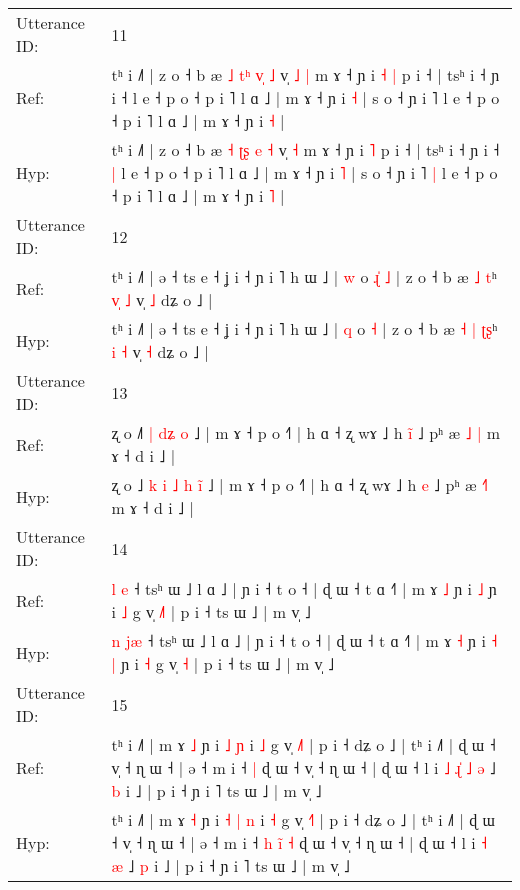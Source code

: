 \documentclass[10pt]{article}
\DeclareRobustCommand{\hl}[1]{{\textcolor{red}{#1}}}
\begin{document}
\begin{longtable}{ll}
 \\
\midrule
Utterance ID: & 11 \\
Ref: & tʰ i ˩˥ | z o ˧ b æ \hl{˩} \hl{t}\hl{ʰ} \hl{v}\hl{̩} \hl{˩} v̩\hl{ }\hl{˩} \hl{|} m ɤ ˧ ɲ i\hl{ }\hl{˧} \hl{|} p i ˧ | tsʰ i ˧ ɲ i ˧\hl{}\hl{} l e ˧ p o ˧ p i ˥ l ɑ ˩ | m ɤ ˧ ɲ i \hl{˧} | s o ˧ ɲ i ˥\hl{}\hl{} l e ˧ p o ˧ p i ˥ l ɑ ˩ | m ɤ ˧ ɲ i \hl{˧} |
 \\
Hyp: & tʰ i ˩˥ | z o ˧ b æ \hl{˧} \hl{ʈ}\hl{ʂ} \hl{}\hl{e} \hl{˧} v̩\hl{}\hl{} \hl{˧} m ɤ ˧ ɲ i\hl{}\hl{} \hl{˥} p i ˧ | tsʰ i ˧ ɲ i ˧\hl{ }\hl{|} l e ˧ p o ˧ p i ˥ l ɑ ˩ | m ɤ ˧ ɲ i \hl{˥} | s o ˧ ɲ i ˥\hl{ }\hl{|} l e ˧ p o ˧ p i ˥ l ɑ ˩ | m ɤ ˧ ɲ i \hl{˥} |
 \\
\midrule
Utterance ID: & 12 \\
Ref: & tʰ i ˩˥ | ə ˧ ts e ˧ ʝ i ˧ ɲ i ˥ h ɯ ˩ | \hl{w} o\hl{ }\hl{ɻ}\hl{̍} \hl{˩} | z o ˧ b æ\hl{}\hl{} \hl{˩} \hl{}\hl{t}ʰ \hl{v}\hl{̩} \hl{˩} v̩ \hl{˩} dʑ o ˩ |
 \\
Hyp: & tʰ i ˩˥ | ə ˧ ts e ˧ ʝ i ˧ ɲ i ˥ h ɯ ˩ | \hl{q} o\hl{}\hl{}\hl{} \hl{˧} | z o ˧ b æ\hl{ }\hl{˧} \hl{|} \hl{ʈ}\hl{ʂ}ʰ \hl{}\hl{i} \hl{˧} v̩ \hl{˧} dʑ o ˩ |
 \\
\midrule
Utterance ID: & 13 \\
Ref: & ʐ o ˩\hl{}\hl{˥} \hl{|} \hl{}\hl{d}\hl{ʑ} \hl{}\hl{o} ˩ | m ɤ ˧ p o ˧˥ | h ɑ ˧ ʐ wɤ ˩ h \hl{i}\hl{̃} ˩ pʰ æ \hl{˩}\hl{ }\hl{|} m ɤ ˧ d i ˩ |
 \\
Hyp: & ʐ o ˩\hl{ }\hl{k} \hl{i} \hl{˩}\hl{ }\hl{h} \hl{i}\hl{̃} ˩ | m ɤ ˧ p o ˧˥ | h ɑ ˧ ʐ wɤ ˩ h \hl{}\hl{e} ˩ pʰ æ \hl{}\hl{˧}\hl{˥} m ɤ ˧ d i ˩ |
 \\
\midrule
Utterance ID: & 14 \\
Ref: & \hl{l} \hl{}\hl{e} ˧ tsʰ ɯ ˩ l ɑ ˩ | ɲ i ˧ t o ˧ | ɖ ɯ ˧ t ɑ ˧˥ | m ɤ \hl{˩} ɲ i\hl{}\hl{} \hl{˩} ɲ i \hl{˩} g v̩ \hl{˩}\hl{˥} | p i ˧ ts ɯ ˩ | m v̩ ˩
 \\
Hyp: & \hl{n} \hl{j}\hl{æ} ˧ tsʰ ɯ ˩ l ɑ ˩ | ɲ i ˧ t o ˧ | ɖ ɯ ˧ t ɑ ˧˥ | m ɤ \hl{˧} ɲ i\hl{ }\hl{˧} \hl{|} ɲ i \hl{˧} g v̩ \hl{}\hl{˧} | p i ˧ ts ɯ ˩ | m v̩ ˩
 \\
\midrule
Utterance ID: & 15 \\
Ref: & tʰ i ˩˥ | m ɤ \hl{˩} ɲ i\hl{}\hl{} \hl{˩} \hl{ɲ} i \hl{˩} g v̩ \hl{˩}˥ | p i ˧ dʑ o ˩ | tʰ i ˩˥ | ɖ ɯ ˧ v̩ ˧ ɳ ɯ ˧ | ə ˧ m i ˧\hl{}\hl{}\hl{}\hl{}\hl{} \hl{|} ɖ ɯ ˧ v̩ ˧ ɳ ɯ ˧ | ɖ ɯ ˧ l i\hl{ }\hl{˩}\hl{ }\hl{ɻ}\hl{̍} \hl{˩} \hl{ə} ˩ \hl{b} i ˩ | p i ˧ ɲ i ˥ ts ɯ ˩ | m v̩ ˩
 \\
Hyp: & tʰ i ˩˥ | m ɤ \hl{˧} ɲ i\hl{ }\hl{˧} \hl{|} \hl{n} i \hl{˧} g v̩ \hl{˧}˥ | p i ˧ dʑ o ˩ | tʰ i ˩˥ | ɖ ɯ ˧ v̩ ˧ ɳ ɯ ˧ | ə ˧ m i ˧\hl{ }\hl{h}\hl{ }\hl{i}\hl{̃} \hl{˧} ɖ ɯ ˧ v̩ ˧ ɳ ɯ ˧ | ɖ ɯ ˧ l i\hl{}\hl{}\hl{}\hl{}\hl{} \hl{˧} \hl{æ} ˩ \hl{p} i ˩ | p i ˧ ɲ i ˥ ts ɯ ˩ | m v̩ ˩

\end{longtable}
\end{document}
